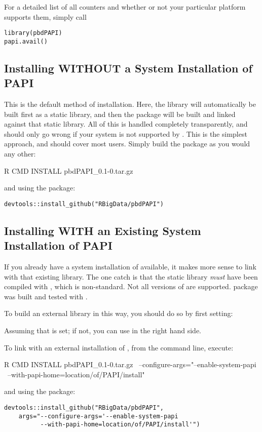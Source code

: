 For a detailed list of all counters and whether or not your particular platform 
supports them, simply call 
\begin{lstlisting}[language=rr]
library(pbdPAPI)
papi.avail()
\end{lstlisting}





\subsection{Installing WITHOUT a System Installation of PAPI}

This is the default method of installation.  Here, the \PAPI library will  
automatically be built first as a static library, and then the \thispackage 
package will be built and linked against that static library.  All of this is 
handled completely transparently, and should only go wrong if your system is not 
supported by \PAPI.  This is the simplest approach, and should cover most users. 
 Simply build the package as you would any other:
\begin{Command}
R CMD INSTALL pbdPAPI_0.1-0.tar.gz
\end{Command}
and using the  package:
\begin{lstlisting}[language=rr]
devtools::install_github("RBigData/pbdPAPI")
\end{lstlisting}




\subsection{Installing WITH an Existing System Installation of PAPI}

If you already have a system installation of \PAPI available, it makes more  
sense to link with that existing library.  The one catch is that the static 
library \emph{must} have been compiled with , which is 
non-standard. Not all versions of \PAPI are supported.  \thispackage package 
was built and tested with \PAPI \PAPIversion.


 To build an external \PAPI library in this way, you should do so by first 
setting:
Assuming that  is set; if not, you can use  in the right hand 
side.

To link with an external installation of \PAPI, from the command line, execute:
\begin{Command}
R CMD INSTALL pbdPAPI_0.1-0.tar.gz \ 
    --configure-args="--enable-system-papi \ 
    --with-papi-home=location/of/PAPI/install"
\end{Command}
and using the  package:
\begin{lstlisting}
devtools::install_github("RBigData/pbdPAPI", 
    args="--configure-args='--enable-system-papi 
          --with-papi-home=location/of/PAPI/install'")
\end{lstlisting}

